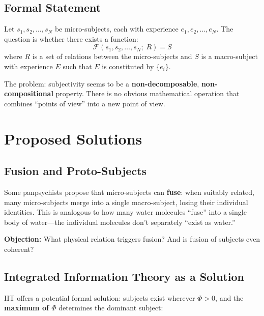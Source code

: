 \documentclass[11pt,a4paper]{report}
\begin{document}
\subsection{Formal Statement}

\begin{mathbox}
\vspace{-6pt}
Let $s_1, s_2, \ldots, s_N$ be micro-subjects, each with experience $e_1, e_2, \ldots, e_N$. The question is whether there exists a function:
\[
  \mathcal{F}(s_1, s_2, \ldots, s_N;\; R) = S
\]
where $R$ is a set of relations between the micro-subjects and $S$ is a macro-subject with experience $E$ such that $E$ is constituted by $\{e_i\}$.

The problem: subjectivity seems to be a \textbf{non-decomposable}, \textbf{non-compositional} property. There is no obvious mathematical operation that combines ``points of view'' into a new point of view.
\vspace{-4pt}
\end{mathbox}

\section{Proposed Solutions}

\subsection{Fusion and Proto-Subjects}

Some panpsychists propose that micro-subjects can \textbf{fuse}: when suitably related, many micro-subjects merge into a single macro-subject, losing their individual identities. This is analogous to how many water molecules ``fuse'' into a single body of water---the individual molecules don't separately ``exist as water.''

\textbf{Objection:} What physical relation triggers fusion? And is fusion of subjects even coherent?

\subsection{Integrated Information Theory as a Solution}

IIT offers a potential formal solution: subjects exist wherever $\Phi > 0$, and the \textbf{maximum of $\Phi$} determines the dominant subject:
\end{document}
